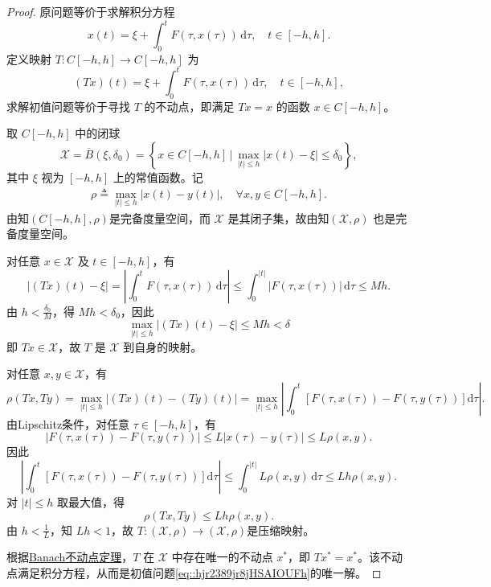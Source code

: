 \documentclass[../../main.tex]{subfiles}%
\begin{document}
\begin{proof}

原问题等价于求解积分方程
\[
x(t) = \xi + \int_0^t F(\tau, x(\tau)) \, \mathrm{d}\tau, \quad t\in[-h,h].
\]
定义映射 $T: C[-h,h] \to C[-h,h]$ 为
\[
(Tx)(t) = \xi + \int_0^t F(\tau, x(\tau)) \, \mathrm{d}\tau, \quad t\in[-h,h],
\]
求解初值问题等价于寻找 $T$ 的不动点，即满足 $Tx = x$ 的函数 $x\in C[-h,h]$。

取 $C[-h,h]$ 中的闭球
\[
\mathcal{X} = \overline{B}(\xi, \delta_0) = \left\{ x\in C[-h,h] \,\bigg|\, \max_{|t|\leqslant h} |x(t) - \xi| \leqslant \delta_0 \right\},
\]
其中 $\xi$ 视为 $[-h,h]$ 上的常值函数。记
\begin{align*}
\rho \triangleq \max_{|t|\leqslant h} \left| x(t) - y(t) \right|,\quad \forall x,y\in C[-h,h].
\end{align*}
由知$(C[-h,h],\rho)$是完备度量空间，而 $\mathcal{X}$ 是其闭子集，故由知$(\mathcal{X},\rho)$ 也是完备度量空间。

对任意 $x\in \mathcal{X}$ 及 $t\in[-h,h]$，有
\[
|(Tx)(t) - \xi| = \left| \int_0^t F(\tau, x(\tau)) \, \mathrm{d}\tau \right| \leqslant \int_0^{|t|} |F(\tau, x(\tau))| \, \mathrm{d}\tau \leqslant M h.
\]
由 $h < \frac{\delta_0}{M}$，得 $Mh < \delta_0$，因此
\[
\max_{|t|\leqslant h} |(Tx)(t) - \xi| \leqslant Mh < \delta
\]
即 $Tx\in \mathcal{X}$，故 $T$ 是 $\mathcal{X}$ 到自身的映射。

对任意 $x,y\in \mathcal{X}$，有
\[
\rho(Tx, Ty) = \max_{|t|\leqslant h} \left| (Tx)(t) - (Ty)(t) \right| = \max_{|t|\leqslant h} \left| \int_0^t \left[ F(\tau,x(\tau)) - F(\tau,y(\tau)) \right] \mathrm{d}\tau \right|.
\]
由Lipschitz条件，对任意 $\tau\in[-h,h]$，有
\[
|F(\tau,x(\tau)) - F(\tau,y(\tau))| \leqslant L |x(\tau) - y(\tau)| \leqslant L \rho(x,y).
\]
因此
\[
\left| \int_0^t \left[ F(\tau,x(\tau)) - F(\tau,y(\tau)) \right] \mathrm{d}\tau \right| \leqslant \int_0^{|t|} L \rho(x,y) \, \mathrm{d}\tau \leqslant L h \rho(x,y).
\]
对 $|t|\leqslant h$ 取最大值，得
\[
\rho(Tx, Ty) \leqslant L h \rho(x,y).
\]
由 $h < \frac{1}{L}$，知 $Lh < 1$，故 $T: (\mathcal{X},\rho)\to (\mathcal{X},\rho)$是压缩映射。

根据\hyperref[theorem:Banach不动点定理——压缩映象原理]{Banach不动点定理}，$T$ 在 $\mathcal{X}$ 中存在唯一的不动点 $x^*$，即 $Tx^* = x^*$。该不动点满足积分方程，从而是初值问题\eqref{eq::hjr2389jr8jHSAIOUFh}的唯一解。

\end{proof}
\end{document}
